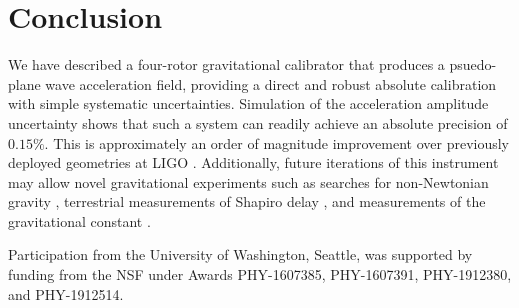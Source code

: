 \documentclass[superscriptaddress, twocolumn, prd]{revtex4-1}
\begin{document}
\section{Conclusion} 
\quad We have described a four-rotor gravitational calibrator that produces a psuedo-plane wave acceleration field, providing a direct and robust absolute calibration with simple systematic uncertainties. Simulation of the acceleration amplitude uncertainty shows that such a system can readily achieve an absolute precision of $0.15\%$. This is approximately an order of magnitude improvement over previously deployed geometries at LIGO \cite{ncal}. Additionally, future iterations of this instrument may allow novel gravitational experiments such as searches for non-Newtonian gravity \citep{PhysRevD.84.082002}, terrestrial measurements of Shapiro delay \citep{Ballmer_2010, Sullivan_2020}, and measurements of the gravitational constant \citep{NCalGPaper}.


\begin{acknowledgements}

Participation from the University of Washington, Seattle, was supported by funding from the NSF under Awards PHY-1607385, PHY-1607391, PHY-1912380, and PHY-1912514.

\end{acknowledgements}


 

\end{document}
